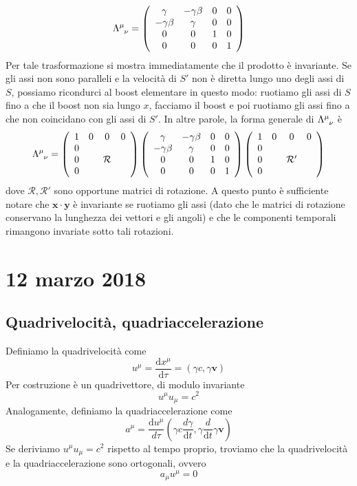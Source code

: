 \documentclass[a4paper,11pt]{book}
\renewcommand{\d}{\mathrm{d}}
\renewcommand{\vec}[1]{\mathbf{#1}}
\theoremstyle{theorem}
\theoremstyle{definition}
\begin{document}
\[\Lambda\indices{^\mu_\nu}=\left(\begin{array}{c c c c}
\gamma&-\gamma\beta&0&0\\-\gamma\beta&\gamma&0&0\\0&0&1&0\\0&0&0&1
\end{array}\right)\]
Per tale trasformazione si mostra immediatamente che il prodotto è invariante. Se gli assi non sono paralleli e la velocità di $S'$ non è diretta lungo uno degli assi di $S$, possiamo ricondurci al boost elementare in questo modo: ruotiamo gli assi di $S$ fino a che il boost non sia lungo $x$, facciamo il boost e poi ruotiamo gli assi fino a che non coincidano con gli assi di $S'$. In altre parole, la forma generale di $\Lambda\indices{^\mu_\nu}$ è
\[\Lambda\indices{^\mu_\nu}=\left(\begin{array}{c c c c}
1&0&0&0\\0&&&\\0&&\mathcal{R}&\\0&&&
\end{array}\right)\left(\begin{array}{c c c c}
\gamma&-\gamma\beta&0&0\\-\gamma\beta&\gamma&0&0\\0&0&1&0\\0&0&0&1
\end{array}\right)\left(\begin{array}{c c c c}
1&0&0&0\\0&&&\\0&&\mathcal{R}'&\\0&&&
\end{array}\right)\]
dove $\mathcal{R},\mathcal{R}'$ sono opportune matrici di rotazione. A questo punto è sufficiente notare che $\vec{x}\cdot\vec{y}$ è invariante se ruotiamo gli assi (dato che le matrici di rotazione conservano la lunghezza dei vettori e gli angoli) e che le componenti temporali rimangono invariate sotto tali rotazioni.
\newpage
\section{12 marzo 2018}
\subsection{Quadrivelocità, quadriaccelerazione}
Definiamo la quadrivelocità come
\[u^\mu=\frac{\d x^\mu}{\d\tau}=\left(\gamma c,\gamma\vec{v}\right)\]
Per costruzione è un quadrivettore, di modulo invariante
\[u^\mu u_\mu=c^2\]
Analogamente, definiamo la quadriaccelerazione come
\[a^\mu=\frac{\d u^\mu}{d\tau}\left(\gamma c\frac{d\gamma}{\d t},\gamma \frac{d}{\d t}\gamma\vec{v}\right)\]
Se deriviamo $u^\mu u_\mu=c^2$ rispetto al tempo proprio, troviamo che la quadrivelocità e la quadriaccelerazione sono ortogonali, ovvero
\[a_\mu u^\mu=0\]
\end{document}
